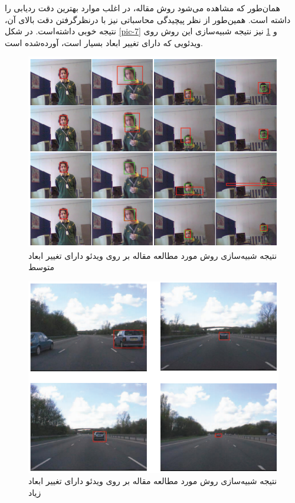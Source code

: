 \documentclass[paper=a4, fontsize=12pt]{article} %
\begin{document}
همان‌طور که مشاهده می‌شود روش مقاله، در اغلب موارد بهترین دقت ردیابی را داشته است. همین‌طور از نظر پیچیدگی محاسباتی نیز با درنظرگرفتن دقت بالای آن، نتیجه خوبی داشته‌است. در شکل \ref{pic-7} و \ref{pic-8} نیز نتیجه شبیه‌سازی این روش روی ویدئویی که دارای تغییر ابعاد بسیار است، آورده‌شده است.
\begin{figure}
\centering
\includegraphics[width=12cm]{fig8.png}
\caption{نتیجه شبیه‌سازی روش مورد مطالعه مقاله بر روی ویدئو دارای تغییر ابعاد متوسط}
\label{pic-8}
\end{figure}

\begin{figure}
\centering
\includegraphics[scale=0.8]{fig9.png}
\caption{نتیجه شبیه‌سازی روش مورد مطالعه مقاله بر روی ویدئو دارای تغییر ابعاد زیاد}
\label{pic-9}
\end{figure}
\end{document}
